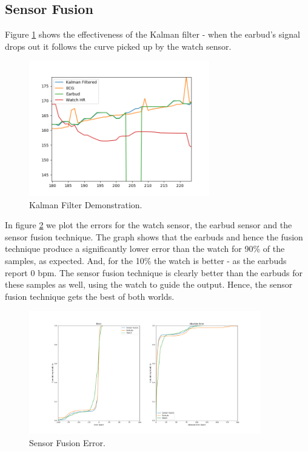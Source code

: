 \documentclass[12pt,a4paper,twoside,openright]{report}
\begin{document}
\subsection{Sensor Fusion}

Figure \ref{fig:kalman-working} shows the effectiveness of the Kalman filter -
when the earbud's signal drops out it follows the curve picked up by the
watch sensor.

\begin{figure}[H]
	\centerline{\includegraphics[width=0.7\textwidth]{figs/kalman-working.png}}
	\caption{Kalman Filter Demonstration.}
	\label{fig:kalman-working}
\end{figure}

In figure \ref{fig:kalman_error} we plot the errors for the watch sensor, the
earbud sensor and the sensor fusion technique. The graph shows that the
earbuds and hence the fusion technique produce a significantly lower error than the watch for 90\% of the
samples, as expected. And, for the 10\% the watch is better - as the earbuds
report 0 bpm. The sensor fusion technique is clearly better than the earbuds
for these samples as well, using the watch to guide the output. Hence, the
sensor fusion technique gets the best of both worlds.

\begin{figure}[H]
	\centerline{\includegraphics[width=0.9\textwidth]{figs/kalman_validity.png}}
	\caption{Sensor Fusion Error.}
	\label{fig:kalman_error}
\end{figure}
\end{document}
